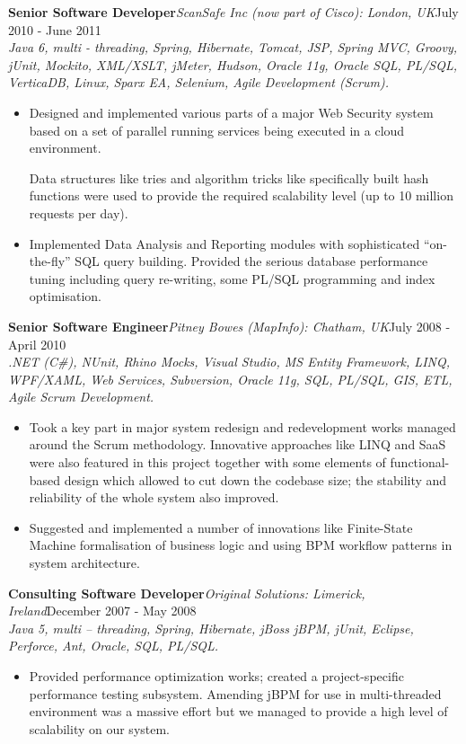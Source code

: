 \documentclass{res}
\newcommand{\jobdes}[4]{\needspace{3\baselineskip} %
{\noindent \bf #3\hspace{2ex}}{{\em \small #1}}{\hfill #2}\\{{\it \small #4.}}}
\newif\ifFullVersion
\begin{document}
\begin{resume}
\jobdes{ScanSafe Inc (now part of Cisco): London, UK}{July 2010 - June 2011}{Senior Software Developer}
{Java 6, multi - threading, Spring, Hibernate, Tomcat, JSP, Spring MVC, Groovy, jUnit, Mockito, XML/XSLT, jMeter, Hudson, Oracle 11g, Oracle SQL, PL/SQL, VerticaDB, Linux, Sparx EA, Selenium, Agile Development (Scrum)}
\begin{itemize} \itemsep -2pt %
 \item Designed and implemented various parts of a major Web Security system based on a set of parallel running services being executed in a cloud environment.
 \ifFullVersion
   This included a lot of re-design work, particularly switching from the standard Java objects to the immutable structures in combination with elements of functional-oriented programming.
\fi
Data structures like tries and algorithm tricks like specifically built hash functions were used to provide the required scalability level (up to 10 million requests per day).
 \item Implemented Data Analysis and Reporting modules with sophisticated “on-the-fly” SQL query building. Provided the serious database performance tuning including query re-writing, some PL/SQL programming and index optimisation.
\end{itemize}

\jobdes{Pitney Bowes (MapInfo): Chatham, UK}{July 2008 - April 2010}{Senior Software Engineer}
{.NET (C\#), NUnit, Rhino Mocks, Visual Studio, MS Entity Framework, LINQ, WPF/XAML, Web Services, Subversion, Oracle 11g, SQL, PL/SQL, GIS, ETL, Agile Scrum Development}
\begin{itemize} \itemsep -2pt %
 \item Took a key part in major system redesign and redevelopment works managed around the Scrum methodology. Innovative approaches like LINQ and SaaS were also featured in this project together with some elements of functional-based design which allowed to cut down the codebase size; the stability and reliability of the whole system also improved.
 \item Suggested and implemented a number of innovations like Finite-State Machine formalisation of business logic and using BPM workflow patterns in system architecture.
\end{itemize}

\jobdes {Original Solutions: Limerick, Ireland}{December 2007 - May 2008}{Consulting Software Developer}
{Java 5, multi – threading, Spring, Hibernate, jBoss jBPM, jUnit, Eclipse, Perforce, Ant, Oracle, SQL, PL/SQL}
\begin{itemize} \itemsep -2pt %
 \item Provided performance optimization works; created a project-specific performance testing subsystem. Amending jBPM for use in multi-threaded environment was a massive effort but we managed to provide a high level of scalability on our system.
\end{itemize}


\end{resume}
\end{document}
